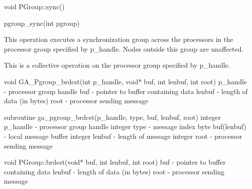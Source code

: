 \documentclass[12pt]{article}
\begin{document}
\begin{cxxapi}
void PGroup::sync()
\end{cxxapi}

\begin{pyapi}
pgroup_sync(int pgroup) 
\end{pyapi} 


\begin{desc}

This operation executes a synchronization group across the processors in the processor group specified by p_handle. Nodes outside this group are unaffected.

This is a collective operation on the processor group specified by p_handle. 
\end{desc}


\begin{capi}
void GA_Pgroup_brdcst(int p_handle, void* buf, int lenbuf, int root)
   p_handle                      - processor group handle                  \access{[input]} 
   buf                           - pointer to buffer 
                                   containing data                   
   lenbuf                        - length of data (in bytes)               \access{[input]} 
   root                          - processor sending message               \access{[input]} 
\end{capi}

\begin{fapi}
subroutine ga_pgroup_brdcst(p_handle, type, buf, lenbuf, root)
   integer p_handle              - processor group handle                  \access{[input]} 
   integer type                  - message index                           \access{[input]} 
   byte buf(lenbuf)              - local message buffer              
   integer lenbuf                - length of message                       \access{[input]} 
   integer root                  - processor sending message               \access{[input]} 
\end{fapi}

\begin{cxxapi}
void PGroup::brdcst(void* buf, int lenbuf, int root)
   buf                 - pointer to buffer containing data          
   lenbuf              - length of data (in bytes)                         \access{[input]}
   root                - processor sending message                         \access{[input]}
\end{cxxapi}
\end{document}
